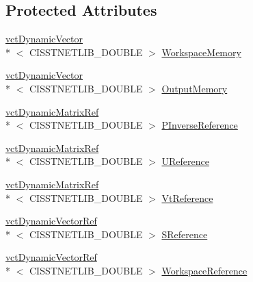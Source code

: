 \subsection*{Protected Attributes}
\begin{DoxyCompactItemize}
\item 
\hyperlink{classvct_dynamic_vector}{vct\-Dynamic\-Vector}\\*
$<$ C\-I\-S\-S\-T\-N\-E\-T\-L\-I\-B\-\_\-\-D\-O\-U\-B\-L\-E $>$ \hyperlink{classnmr_p_inverse_dynamic_data_a799d81175e96446fe8ab3553befd26ee}{Workspace\-Memory}
\item 
\hyperlink{classvct_dynamic_vector}{vct\-Dynamic\-Vector}\\*
$<$ C\-I\-S\-S\-T\-N\-E\-T\-L\-I\-B\-\_\-\-D\-O\-U\-B\-L\-E $>$ \hyperlink{classnmr_p_inverse_dynamic_data_ac1c4149267a493ae2077a77ebe33224a}{Output\-Memory}
\end{DoxyCompactItemize}
{\bf }\par
\begin{DoxyCompactItemize}
\item 
\hyperlink{classvct_dynamic_matrix_ref}{vct\-Dynamic\-Matrix\-Ref}\\*
$<$ C\-I\-S\-S\-T\-N\-E\-T\-L\-I\-B\-\_\-\-D\-O\-U\-B\-L\-E $>$ \hyperlink{classnmr_p_inverse_dynamic_data_a14a45576194a4b72f980276df04b3fd8}{P\-Inverse\-Reference}
\item 
\hyperlink{classvct_dynamic_matrix_ref}{vct\-Dynamic\-Matrix\-Ref}\\*
$<$ C\-I\-S\-S\-T\-N\-E\-T\-L\-I\-B\-\_\-\-D\-O\-U\-B\-L\-E $>$ \hyperlink{classnmr_p_inverse_dynamic_data_a6241a303eaf9bfaf0d0c705690855d55}{U\-Reference}
\item 
\hyperlink{classvct_dynamic_matrix_ref}{vct\-Dynamic\-Matrix\-Ref}\\*
$<$ C\-I\-S\-S\-T\-N\-E\-T\-L\-I\-B\-\_\-\-D\-O\-U\-B\-L\-E $>$ \hyperlink{classnmr_p_inverse_dynamic_data_a7e7d03c38c284a81d84ba35383acf594}{Vt\-Reference}
\item 
\hyperlink{classvct_dynamic_vector_ref}{vct\-Dynamic\-Vector\-Ref}\\*
$<$ C\-I\-S\-S\-T\-N\-E\-T\-L\-I\-B\-\_\-\-D\-O\-U\-B\-L\-E $>$ \hyperlink{classnmr_p_inverse_dynamic_data_a7d2da272cbc56f92c25264181b319330}{S\-Reference}
\item 
\hyperlink{classvct_dynamic_vector_ref}{vct\-Dynamic\-Vector\-Ref}\\*
$<$ C\-I\-S\-S\-T\-N\-E\-T\-L\-I\-B\-\_\-\-D\-O\-U\-B\-L\-E $>$ \hyperlink{classnmr_p_inverse_dynamic_data_af51319d4e7f6a0693f3f23ed52220b5a}{Workspace\-Reference}
\end{DoxyCompactItemize}

